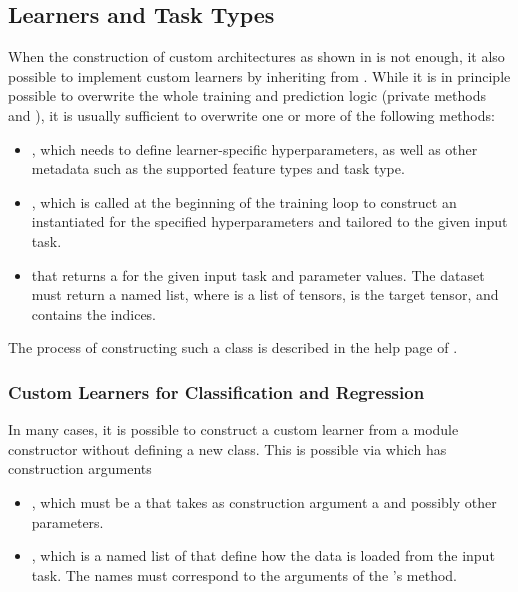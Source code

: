 \documentclass[article]{jss}
\theoremstyle{definition}
\begin{document}
\subsection{Learners and Task Types}\label{sec:extending-learner-task}

When the construction of custom architectures as shown in  is not enough, it also possible to implement custom learners by inheriting from .
While it is in principle possible to overwrite the whole training and prediction logic (private methods  and ), it is usually sufficient to overwrite one or more of the following methods:
\begin{itemize}
    \item {}, which needs to define learner-specific hyperparameters, as well as other metadata such as the supported feature types and task type.
    \item {}, which is called at the beginning of the training loop to construct an instantiated  for the specified hyperparameters and tailored to the given input task.
    \item {} that returns a  for the given input task and parameter values. The dataset must return a named list, where  is a list of tensors,  is the target tensor, and  contains the indices.
\end{itemize}

The process of constructing such a class is described in the help page of .

\subsubsection{Custom Learners for Classification and Regression}\label{sec:extending-learner}

In many cases, it is possible to construct a custom learner from a module constructor without defining a new class.
This is possible via  which has construction arguments
\begin{itemize}
    \item {}, which must be a  that takes as construction argument a  and possibly other parameters.
    \item {}, which is a named list of  that define how the data is loaded from the input task. The names must correspond to the arguments of the 's  method.
\end{itemize}
\end{document}

